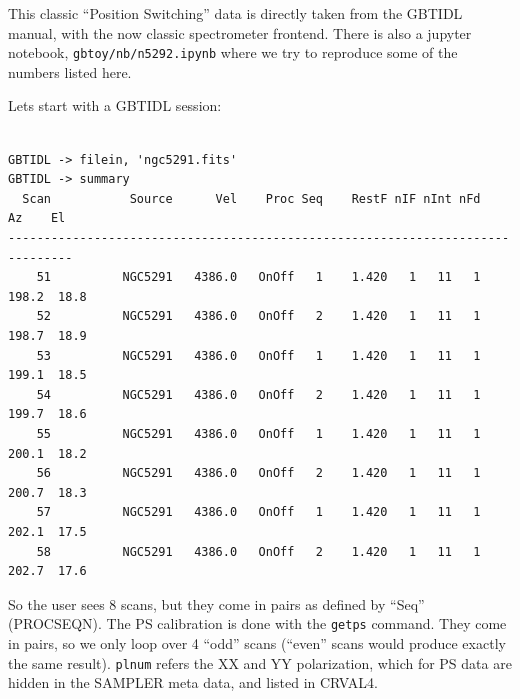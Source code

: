 \documentclass[12pt,a4paper]{article}
\begin{document}
This classic ``Position Switching'' data is directly taken from the GBTIDL manual,
with the now classic spectrometer frontend.  There is also a jupyter notebook,
{\tt gbtoy/nb/n5292.ipynb} where we try to reproduce some of the numbers listed here.


Lets start with a GBTIDL session:

\footnotesize
\begin{lstlisting}

GBTIDL -> filein, 'ngc5291.fits' 
GBTIDL -> summary
  Scan           Source      Vel    Proc Seq    RestF nIF nInt nFd     Az    El
-------------------------------------------------------------------------------
    51          NGC5291   4386.0   OnOff   1    1.420   1   11   1  198.2  18.8
    52          NGC5291   4386.0   OnOff   2    1.420   1   11   1  198.7  18.9
    53          NGC5291   4386.0   OnOff   1    1.420   1   11   1  199.1  18.5
    54          NGC5291   4386.0   OnOff   2    1.420   1   11   1  199.7  18.6
    55          NGC5291   4386.0   OnOff   1    1.420   1   11   1  200.1  18.2
    56          NGC5291   4386.0   OnOff   2    1.420   1   11   1  200.7  18.3
    57          NGC5291   4386.0   OnOff   1    1.420   1   11   1  202.1  17.5
    58          NGC5291   4386.0   OnOff   2    1.420   1   11   1  202.7  17.6
\end{lstlisting}
\normalsize

So the user sees 8 scans, but they come in pairs as defined by ``Seq'' (PROCSEQN).  The
PS calibration is done with the {\tt getps} command. They come in pairs, so we only
loop over 4 ``odd'' scans (``even'' scans would produce exactly the same result).
{\tt plnum} refers the XX and YY polarization, which for PS data are hidden in the SAMPLER
meta data, and listed in CRVAL4.
\end{document}
